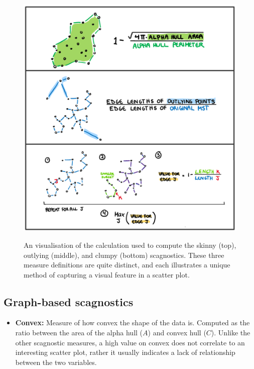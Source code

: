 \begin{figure}
\includegraphics[width=1\linewidth,alt={A hand drawn illustration showing the algorithm of the skinny, outlying and clumpy calculations. In each drawing the edges used in the calculation are highlighted in both the mathematical formula and in the illustration of the scatter plot.}]{figures/drawnmeasures} \caption{ An visualisation of the calculation used to compute the skinny (top), outlying (middle), and clumpy (bottom) scagnostics. These three measure definitions are quite distinct, and each illustrates a unique method of capturing a visual feature in a scatter plot.}\label{fig:scagdrawn}
\end{figure}

\hypertarget{graph-based-scagnostics}{%
\subsection{Graph-based scagnostics}\label{graph-based-scagnostics}}

\begin{itemize}
\tightlist
\item
  \textbf{Convex:} Measure of how convex the shape of the data is. Computed as the ratio between the area of the alpha hull (\(A\)) and convex hull (\(C\)). Unlike the other scagnostic measures, a high value on convex does not correlate to an interesting scatter plot, rather it usually indicates a lack of relationship between the two variables.
\end{itemize}

